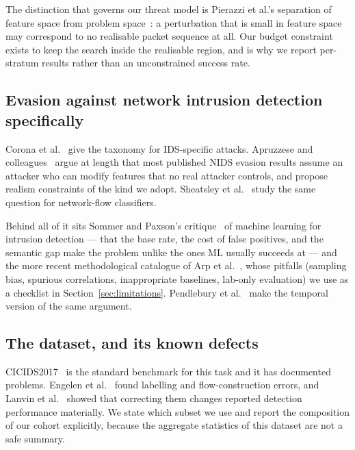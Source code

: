 \documentclass[journal]{IEEEtran}
\providecommand{\citep}[1]{\cite{#1}}
\theoremstyle{definition}
\begin{document}
The distinction that governs our threat model is Pierazzi et al.'s separation of
feature space from problem space~\citep{pierazzi2020problemspace}: a perturbation
that is small in feature space may correspond to no realisable packet sequence
at all. Our budget constraint exists to keep the search inside the realisable
region, and is why we report per-stratum results rather than an unconstrained
success rate.

\subsection{Evasion against network intrusion detection specifically}

Corona et al.~\citep{corona2013adversarial} give the taxonomy for IDS-specific
attacks. Apruzzese and colleagues~\citep{apruzzese2019addressing,
apruzzese2022modeling} argue at length that most published NIDS evasion results
assume an attacker who can modify features that no real attacker
controls, and propose realism constraints of the kind we adopt. Sheatsley et
al.~\citep{sheatsley2022adversarial} study the same question for
network-flow classifiers.

Behind all of it sits Sommer and Paxson's
critique~\citep{sommer2010outside} of machine learning for intrusion detection ---
that the base rate, the cost of false positives, and the semantic gap make the
problem unlike the ones ML usually succeeds at --- and the more recent
methodological catalogue of Arp et al.~\citep{arp2022dosdonts}, whose pitfalls
(sampling bias, spurious correlations, inappropriate baselines, lab-only
evaluation) we use as a checklist in Section~\ref{sec:limitations}.
Pendlebury et al.~\citep{pendlebury2019tesseract} make the temporal version of the
same argument.

\subsection{The dataset, and its known defects}

CICIDS2017~\citep{sharafaldin2018cicids} is the standard benchmark for this task
and it has documented problems. Engelen et
al.~\citep{engelen2021troubleshooting} found labelling and flow-construction
errors, and Lanvin et al.~\citep{lanvin2022errors} showed that correcting them
changes reported detection performance materially. We state which subset we use
and report the composition of our cohort explicitly, because the aggregate
statistics of this dataset are not a safe summary.
\end{document}
